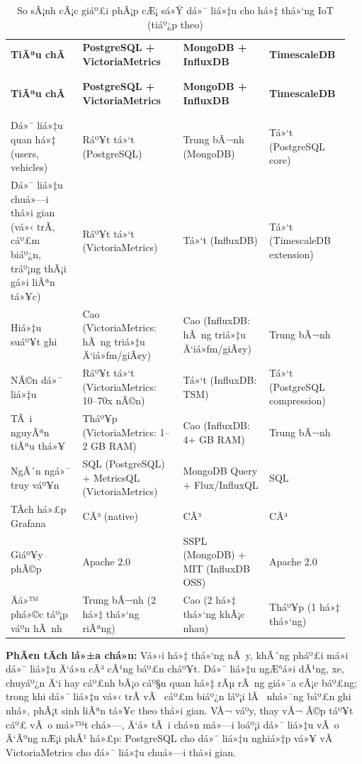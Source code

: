 \documentclass[a4paper]{extarticle}
\newcommand{\thesissettableid}[2]{%
  \renewcommand{\thetable}{#1}%
  \renewcommand{\theHtable}{#2}%
}
\begin{document}
{\thesissettableid{2.4}{tab-ch2-iot-database-solutions}
\def\LTcaptype{table}
\begin{longtable}{|L{0.203\linewidth}|L{0.285\linewidth}|L{0.240\linewidth}|L{0.226\linewidth}|}
\caption{So sÃ¡nh cÃ¡c giáº£i phÃ¡p cÆ¡ sá»Ÿ dá»¯ liá»‡u cho há»‡ thá»‘ng IoT}\label{tab:ch2-iot-database-solutions}\\
\hline \textbf{TiÃªu chÃ­} & \textbf{PostgreSQL + VictoriaMetrics} & \textbf{MongoDB + InfluxDB} & \textbf{TimescaleDB} \\
\\\hline
\endfirsthead
\caption[]{So sÃ¡nh cÃ¡c giáº£i phÃ¡p cÆ¡ sá»Ÿ dá»¯ liá»‡u cho há»‡ thá»‘ng IoT (tiáº¿p theo)}\\
\hline \textbf{TiÃªu chÃ­} & \textbf{PostgreSQL + VictoriaMetrics} & \textbf{MongoDB + InfluxDB} & \textbf{TimescaleDB} \\
\\\hline
\endhead
\\\hline
\endfoot
\endlastfoot
Dá»¯ liá»‡u quan há»‡ (users, vehicles) & Ráº¥t tá»‘t (PostgreSQL) & Trung bÃ¬nh
(MongoDB) & Tá»‘t (PostgreSQL core) \\\hline
Dá»¯ liá»‡u chuá»—i thá»i gian (vá»‹ trÃ­, cáº£m biáº¿n, tráº¡ng thÃ¡i gá»­i liÃªn tá»¥c) & Ráº¥t tá»‘t (VictoriaMetrics) & Tá»‘t
(InfluxDB) & Tá»‘t (TimescaleDB extension) \\\hline
Hiá»‡u suáº¥t ghi & Cao (VictoriaMetrics: hÃ ng triá»‡u Ä‘iá»ƒm/giÃ¢y) & Cao (InfluxDB:
hÃ ng triá»‡u Ä‘iá»ƒm/giÃ¢y) & Trung bÃ¬nh \\\hline
NÃ©n dá»¯ liá»‡u & Ráº¥t tá»‘t (VictoriaMetrics: 10--70x nÃ©n) & Tá»‘t (InfluxDB: TSM) & Tá»‘t
(PostgreSQL compression) \\\hline
TÃ i nguyÃªn tiÃªu thá»¥ & Tháº¥p (VictoriaMetrics: 1--2 GB RAM) & Cao (InfluxDB: 4+ GB RAM)
& Trung bÃ¬nh \\\hline
NgÃ´n ngá»¯ truy váº¥n & SQL (PostgreSQL) + MetricsQL (VictoriaMetrics) & MongoDB Query +
Flux/InfluxQL & SQL \\\hline
TÃ­ch há»£p Grafana & CÃ³ (native) & CÃ³ & CÃ³ \\\hline
Giáº¥y phÃ©p & Apache 2.0 & SSPL (MongoDB) + MIT (InfluxDB OSS) & Apache
2.0 \\\hline
Äá»™ phá»©c táº¡p váº­n hÃ nh & Trung bÃ¬nh (2 há»‡ thá»‘ng riÃªng) & Cao (2 há»‡ thá»‘ng
khÃ¡c nhau) & Tháº¥p (1 há»‡ thá»‘ng) \\\hline
\end{longtable}
}

\textbf{PhÃ¢n tÃ­ch lá»±a chá»n:} Vá»›i há»‡ thá»‘ng nÃ y, khÃ´ng pháº£i má»i dá»¯ liá»‡u
Ä‘á»u cÃ³ cÃ¹ng báº£n cháº¥t. Dá»¯ liá»‡u ngÆ°á»i dÃ¹ng, xe, chuyáº¿n Ä‘i hay cáº£nh bÃ¡o cáº§n
quan há»‡ rÃµ rÃ ng giá»¯a cÃ¡c báº£ng; trong khi dá»¯ liá»‡u vá»‹ trÃ­ vÃ  cáº£m biáº¿n láº¡i
lÃ  nhá»¯ng báº£n ghi nhá», phÃ¡t sinh liÃªn tá»¥c theo thá»i gian. VÃ¬ váº­y, thay vÃ¬
Ã©p táº¥t cáº£ vÃ o má»™t chá»—, Ä‘á» tÃ i chá»n má»—i loáº¡i dá»¯ liá»‡u vÃ o Ä‘Ãºng nÆ¡i phÃ¹
há»£p: PostgreSQL cho dá»¯ liá»‡u nghiá»‡p vá»¥ vÃ  VictoriaMetrics cho dá»¯ liá»‡u
chuá»—i thá»i gian.
\end{document}
